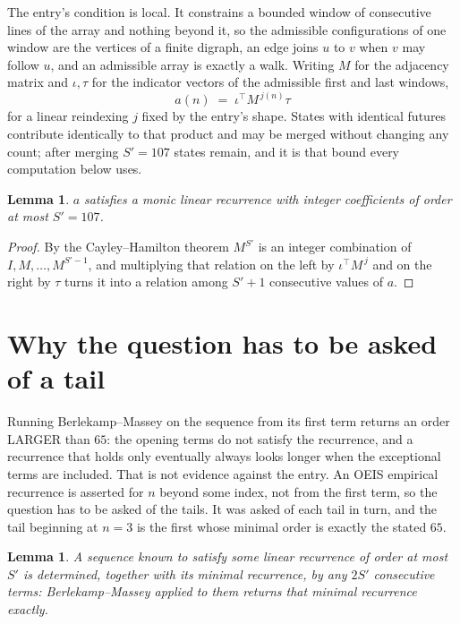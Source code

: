 \documentclass[11pt,a4paper]{article}
\theoremstyle{plain}
\newtheorem{lemma}[theorem]{Lemma}
\theoremstyle{definition}
\begin{document}
The entry's condition is local. It constrains a bounded window of consecutive lines of the
array and nothing beyond it, so the admissible configurations of one window are the vertices of
a finite digraph, an edge joins $u$ to $v$ when $v$ may follow $u$, and an admissible array is
exactly a walk. Writing $M$ for the adjacency matrix and $\iota,\tau$ for the indicator vectors
of the admissible first and last windows,
\[
a(n)\;=\;\iota^{\!\top}M^{\,j(n)}\tau
\]
for a linear reindexing $j$ fixed by the entry's shape. States with identical futures
contribute identically to that product and may be merged without changing any count; after
merging $S'=107$ states remain, and it is that bound every computation below uses.

\begin{lemma}\label{lem:cf}
$a$ satisfies a monic linear recurrence with integer coefficients of order at most $S'=107$.
\end{lemma}

\begin{proof}
By the Cayley--Hamilton theorem $M^{S'}$ is an integer combination of $I,M,\dots,M^{S'-1}$,
and multiplying that relation on the left by $\iota^{\!\top}M^{\,j}$ and on the right by
$\tau$ turns it into a relation among $S'+1$ consecutive values of $a$.
\end{proof}

\section{Why the question has to be asked of a tail}

Running Berlekamp--Massey on the sequence from its first term returns an order LARGER than $65$: the opening terms do not satisfy the recurrence, and a recurrence that holds only eventually always looks longer when the exceptional terms are included. That is not evidence against the entry. An OEIS empirical recurrence is asserted for $n$ beyond some index, not from the first term, so the question has to be asked of the tails. It was asked of each tail in turn, and the tail beginning at $n=3$ is the first whose minimal order is exactly the stated $65$.

\begin{lemma}\label{lem:bm}
A sequence known to satisfy some linear recurrence of order at most $S'$ is determined,
together with its minimal recurrence, by any $2S'$ consecutive terms: Berlekamp--Massey applied
to them returns that minimal recurrence exactly.
\end{lemma}
\end{document}
